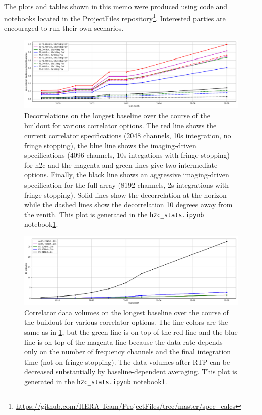 \documentclass{article}
\begin{document}
The plots and tables shown in this memo were produced using code and notebooks located in the 
ProjectFiles repository\footnote{\label{code_link} \url{https://github.com/HERA-Team/ProjectFiles/tree/master/spec_calcs}}. 
Interested parties are encouraged to run their own scenarios.

\begin{figure}
\includegraphics[width=\textwidth]{spec_calcs/decorrelation.png} 
\caption{Decorrelations on the longest baseline over the course of the buildout for various correlator options. The red line shows the current 
correlator specifications (2048 channels, 10s integration, no fringe stopping), the blue line shows the imaging-driven specifications 
(4096 channels, 10s integations with fringe stopping) for h2c and the magenta and green lines give two intermediate options. 
Finally, the black line shows an aggressive imaging-driven specification for the full array (8192 channels, 2s integrations with fringe stopping). 
Solid lines show the decorrelation at the horizon while the dashed lines show the decorrelation 10 degrees away from the zenith. 
This plot is generated in the  \texttt{h2c\_stats.ipynb} notebook\cref{code_link}.}
\label{Fig:decorr}
\end{figure}

\begin{figure}
\includegraphics[width=\textwidth]{spec_calcs/corr_data_vols.png} 
\caption{Correlator data volumes on the longest baseline over the course of the buildout for various correlator options. 
The line colors are the same as in \ref{Fig:decorr}, but the green line is on top of the red line and the blue line is on top of the magenta line
because the data rate depends only on the number of frequency channels and the final integration time (not on fringe stopping). 
The data volumes after RTP can be decreased substantially by baseline-dependent averaging.
This plot is generated in the  \texttt{h2c\_stats.ipynb} notebook\cref{code_link}.}
\label{Fig:corr_vol}
\end{figure}
\end{document}

